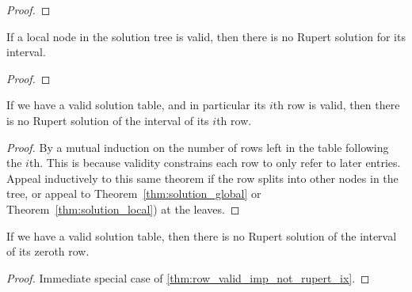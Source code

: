 \begin{proof}\leanok
{}
\end{proof}

\begin{theorem}
\label{thm:solution_local}
If a local node in the solution tree is valid, then there is no Rupert solution for its interval.
\leanok
{}
\end{theorem}

\begin{proof}\leanok
{}
\end{proof}


\begin{theorem}
\leanok
{}
\label{thm:row_valid_imp_not_rupert_ix}
If we have a valid solution table, and in particular its $i$th row is valid,
then there is no Rupert solution of the interval of its $i$th row.
\end{theorem}

\begin{proof}
\leanok
{}
By a mutual induction on the number of rows left in the table following the $i$th. This
is because validity constrains each row to only refer to later entries.
Appeal inductively to this same theorem if the row splits into other nodes in
the tree, or appeal to Theorem~\ref{thm:solution_global} or Theorem~\ref{thm:solution_local}) at the leaves.
\end{proof}

\begin{corollary}
\leanok
{}
\label{thm:row_valid_imp_not_rupert}
If we have a valid solution table, then there is no Rupert solution of the interval of its zeroth row.
\end{corollary}

\begin{proof}
\leanok
{}
Immediate special case of \cref{thm:row_valid_imp_not_rupert_ix}.
\end{proof}
